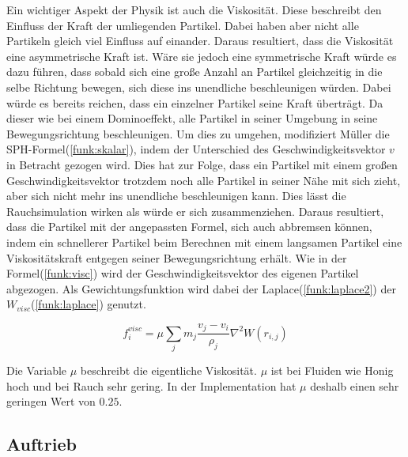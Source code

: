 \documentclass[intern,palatino]{cgBA}
\begin{document}
Ein wichtiger Aspekt der Physik ist auch die Viskosität. Diese beschreibt den Einfluss der Kraft der umliegenden Partikel. Dabei haben aber nicht alle Partikeln gleich viel Einfluss auf einander. Daraus resultiert, dass die Viskosität eine asymmetrische Kraft ist. Wäre sie jedoch eine symmetrische Kraft würde es dazu führen, dass sobald sich eine große Anzahl an Partikel gleichzeitig in die selbe Richtung bewegen, sich diese ins unendliche beschleunigen würden. Dabei würde es bereits reichen, dass ein einzelner Partikel seine Kraft überträgt. Da dieser wie bei einem Dominoeffekt, alle Partikel in seiner Umgebung in seine Bewegungsrichtung beschleunigen. Um dies zu umgehen, modifiziert Müller \cite{muller2003particle} die SPH-Formel(\ref{funk:skalar}), indem der Unterschied des Geschwindigkeitsvektor $v$ in Betracht gezogen wird. Dies hat zur Folge, dass ein Partikel mit einem großen Geschwindigkeitsvektor trotzdem noch alle Partikel in seiner Nähe mit sich zieht, aber sich nicht mehr ins unendliche beschleunigen kann.
\newline
Dies lässt die Rauchsimulation wirken als würde er sich zusammenziehen. Daraus resultiert, dass die Partikel mit der angepassten Formel, sich auch abbremsen können, indem ein schnellerer Partikel beim Berechnen mit einem langsamen Partikel eine Viskositätskraft entgegen seiner Bewegungsrichtung erhält. 
\newline
Wie in der Formel(\ref{funk:visc}) wird der Geschwindigkeitsvektor des eigenen Partikel abgezogen. Als Gewichtungsfunktion wird dabei der Laplace(\ref{funk:laplace2}) der $W_{visc}$(\ref{funk:laplace}) genutzt.

\begin{equation}\label{funk:visc}
f^{visc}_i  = \mu \sum_j m_j \frac{v_j-v_i}{\rho_j} \nabla^2 W(r_{i,j})
\end{equation}

Die Variable $\mu$ beschreibt die eigentliche Viskosität. $\mu$ ist bei Fluiden wie Honig hoch und bei Rauch sehr gering. In der Implementation hat $\mu$ deshalb einen sehr geringen Wert von $0.25$.


\subsection{Auftrieb}\label{auftrieb}
\end{document}
